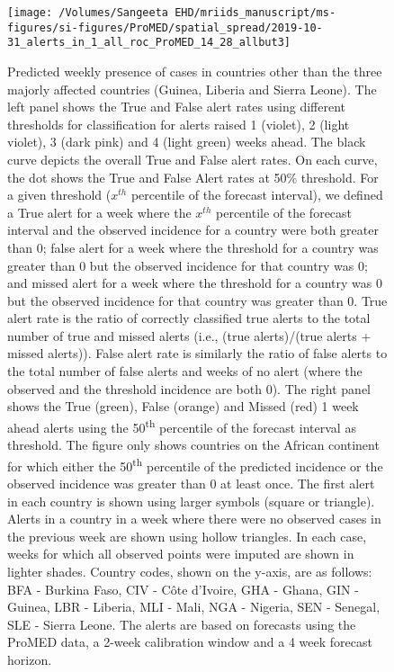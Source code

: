 \documentclass[9pt,twoside,lineno]{pnas-new}
\begin{document}
\begin{figure}
\centering
\texttt{[image: /Volumes/Sangeeta EHD/mriids\_manuscript/ms-figures/si-figures/ProMED/spatial\_spread/2019-10-31\_alerts\_in\_1\_all\_roc\_ProMED\_14\_28\_allbut3]}
\caption{Predicted weekly presence of cases in
countries other than the three majorly affected countries (Guinea,
Liberia and Sierra Leone). The left panel shows the True and False alert rates using
different thresholds for classification for alerts raised 1 (violet), 2
(light violet), 3 (dark pink) and 4 (light green) weeks ahead. The
black curve depicts the overall True and False alert rates. On each
curve, the dot shows the True and False Alert rates at 50\% threshold.
For a given threshold (\(x^{th}\)
percentile of the forecast interval), we defined a True alert for a week
where the \(x^{th}\) percentile of the forecast interval and the
observed incidence for a country were both greater than 0; false alert
for a week where the threshold for a country was greater than 0 but the
observed incidence for that country was 0; and missed alert for a week where
the threshold for a country was 0 but the observed incidence for that
country was greater than 0. True alert rate is the ratio of correctly
classified true alerts to the total number of true and missed alerts
(i.e., (true alerts)/(true alerts + missed alerts)). False alert rate is
similarly the ratio of false alerts to the total number of false alerts
and weeks of no alert (where the observed and the threshold incidence
are both 0). The right panel shows the True (green), False (orange) and
Missed (red) 1 week ahead alerts using the 50\textsuperscript{th} percentile of the
forecast interval as threshold. 
The figure only shows countries on the
African continent for which either the 50\textsuperscript{th}
percentile of the predicted incidence or the
observed incidence was greater than 0 at least once. 
The first alert in each country is shown
using larger symbols (square or triangle). Alerts in a country in a
week where there were no observed cases in the previous week are shown
using hollow triangles. In each case, weeks for which all observed points
were imputed are shown in lighter shades.
Country codes, shown on the y-axis, are as
follows: BFA - Burkina Faso, CIV - Côte d'Ivoire,
GHA - Ghana, GIN - Guinea, LBR - Liberia, MLI - Mali, NGA - Nigeria,
SEN - Senegal, SLE - Sierra Leone. The alerts are based on forecasts 
using the ProMED data, a 2-week calibration window and a 4 week
forecast horizon.}
\label{fig:alertsallbut3}
\end{figure}\FloatBarrier
\end{document}
